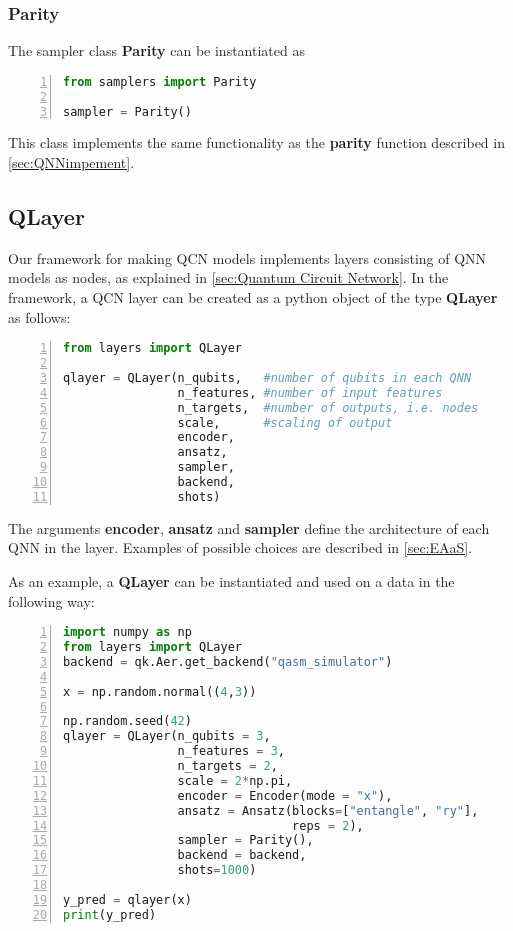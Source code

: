 \subsubsection*{Parity}
The sampler class \textbf{Parity} can be instantiated as
\begin{lstlisting}[language=python, numbers=left]
from samplers import Parity

sampler = Parity()
\end{lstlisting}
This class implements the same functionality as the \textbf{parity} function described in \autoref{sec:QNNimpement}.

\subsection{QLayer}\label{sec:QLayer}

Our framework for making QCN models implements layers consisting of QNN models as nodes, as explained in \autoref{sec:Quantum Circuit Network}. In the framework, a QCN layer can be created as a python object of the type \textbf{QLayer} as follows:

\begin{lstlisting}[language=python, numbers=left]
from layers import QLayer

qlayer = QLayer(n_qubits,   #number of qubits in each QNN
                n_features, #number of input features
                n_targets,  #number of outputs, i.e. nodes
                scale,      #scaling of output
                encoder,
                ansatz,
                sampler,
                backend,
                shots)
\end{lstlisting}

The arguments \textbf{encoder}, \textbf{ansatz} and \textbf{sampler} define the architecture of each QNN in the layer. Examples of possible choices are described in \autoref{sec:EAaS}. 

As an example, a \textbf{QLayer} can be instantiated and used on a data in the following way:


\begin{lstlisting}[language=python, numbers=left]
import numpy as np
from layers import QLayer
backend = qk.Aer.get_backend("qasm_simulator")

x = np.random.normal((4,3))

np.random.seed(42)
qlayer = QLayer(n_qubits = 3,
                n_features = 3,
                n_targets = 2,
                scale = 2*np.pi,
                encoder = Encoder(mode = "x"),
                ansatz = Ansatz(blocks=["entangle", "ry"],
                                reps = 2),
                sampler = Parity(),
                backend = backend,
                shots=1000)
                
y_pred = qlayer(x)
print(y_pred)
\end{lstlisting}

